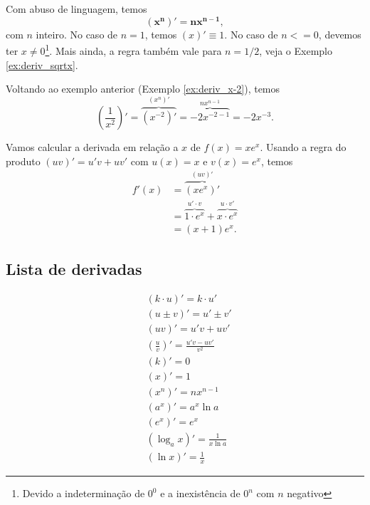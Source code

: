\begin{obs}
  Com abuso de linguagem, temos
  \begin{equation}
    \pmb{(x^n)' = nx^{n-1}},
  \end{equation}
  com $n$ inteiro. No caso de $n=1$, temos $(x)' \equiv 1$. No caso de $n <= 0$, devemos ter $x\neq 0$\footnote{Devido a indeterminação de $0^0$ e a inexistência de $0^n$ com $n$ negativo}. Mais ainda, a regra também vale para $n=1/2$, veja o Exemplo \ref{ex:deriv_sqrtx}. 
\end{obs}

\begin{ex}
  Voltando ao exemplo anterior (Exemplo \ref{ex:deriv_x-2}), temos
  \begin{equation}
    \left(\frac{1}{x^2}\right)' = \overbrace{(x^{-2})'}^{(x^n)'} = \overbrace{-2x^{-2-1}}^{nx^{n-1}} = -2x^{-3}.
  \end{equation}
\end{ex}

\begin{ex}
  Vamos calcular a derivada em relação a $x$ de $f(x) = xe^x$. Usando a regra do produto $(uv)' = u'v + uv'$ com $u(x) = x$ e $v(x) = e^x$, temos
  \begin{align}
    f'(x) &= \overbrace{(xe^x)'}^{(uv)'}\\
          &= \overbrace{1\cdot e^x}^{u'\cdot v} + \overbrace{x\cdot e^x}^{u\cdot v'}\\
          &= (x + 1)e^x.
  \end{align}
\end{ex}

\subsection{Lista de derivadas}

\begin{align}
  &(k\cdot u)' = k\cdot u'\\
  &(u\pm v)' = u' \pm v'\\
  &(uv)' = u'v + uv'\\
  &\left(\frac{u}{v}\right)' = \frac{u'v - uv'}{v^2}\\
  &(k)' = 0\\
  &(x)' = 1\\
  &(x^n)' = nx^{n-1}\\
  &(a^x)' = a^x\ln a\\
  &(e^x)' = e^x\\
  &(\log_a x)' = \frac{1}{x\ln a}\\
  &(\ln x)' = \frac{1}{x}
\end{align}


